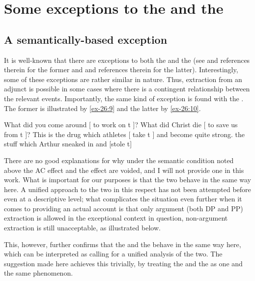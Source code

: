 \documentclass[output=paper]{langsci/langscibook}
\begin{document}
\section{Some exceptions to the  and the
}\label{sec:35.3}

\subsection{A semantically-based exception}\label{sub:35.3.1}

It is well-known that there are exceptions to both the  and the 
(see \citealt{Truswell2011} and references therein for the former and
\citealt{Postal1998} and
references therein for the latter). Interestingly, some of these exceptions are
rather similar in nature. Thus, extraction from an adjunct is possible in some
cases where there is a contingent relationship between the relevant events.
Importantly, the same kind of exception is found with the . The former is
illustrated by \eqref{ex-26:9} and the latter by \eqref{ex-26:10}.\largerpage[2]

\ea\label{ex-26:9}
	\ea What did you come around [ to work on t ]?
	\ex What did Christ die [ to save us from t ]?%
        \hfill\parencite[131]{Truswell2011}
	\z
\ex\label{ex-26:10}
	\ea This is the drug which athletes [ take t ] and become quite strong.
	\ex the stuff which Arthur sneaked in and [stole t]%
        \hfill\parencite[53]{Postal1998}
	\z
\z

There are no good explanations for why under the semantic condition noted above
the \glsdesc{AC} effect and the  effect are voided,
and I will not provide one in this work. What is important for our purposes is
that the two behave in the same way here. A unified approach to the two in this
respect has not been attempted before even at a descriptive level; what
complicates the situation even further when it comes to providing an actual
account is that only argument (both DP and PP) extraction is allowed in the
exceptional context in question, non-argument extraction is still unacceptable,
as illustrated below.

\z

This, however, further confirms that the  and the  behave in
the same way here, which can be interpreted as calling for a unified analysis
of the two. The suggestion made here achieves this trivially, by treating the
 and the  as one and the same phenomenon.
\end{document}
